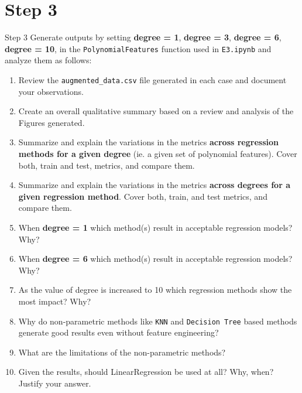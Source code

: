 \section*{Step 3}

\begin{custombox}[label={box:Q3}]{Step 3}
	Generate outputs by setting \textbf{degree = 1}, \textbf{degree = 3}, \textbf{degree = 6}, \textbf{degree = 10}, in the \verb|PolynomialFeatures| function used in \verb|E3.ipynb| and analyze them as follows:
	\begin{enumerate}[label=(\alph*)]
		\item Review the \verb|augmented_data.csv| file generated in each case and document your observations.
		\item Create an overall qualitative summary based on a review and analysis of the Figures generated.
		\item Summarize and explain the variations in the metrics \textbf{across regression methods for a given degree} (ie. a given set of polynomial features). Cover both, train and test, metrics, and compare them.
		\item Summarize and explain the variations in the metrics \textbf{across degrees for a given regression method}. Cover both, train, and test metrics, and compare them.
		\item When \textbf{degree = 1} which method(s) result in acceptable regression models? Why?
		\item When \textbf{degree = 6} which method(s) result in acceptable regression models? Why?
		\item As the value of degree is increased to 10 which regression methods show the most impact? Why?
		\item Why do non-parametric methods like \verb|KNN| and \verb|Decision Tree| based methods generate good results even without feature engineering?
		\item What are the limitations of the non-parametric methods?
		\item  Given the results, should LinearRegression be used at all? Why, when? Justify your answer.
	\end{enumerate}
\end{custombox}


